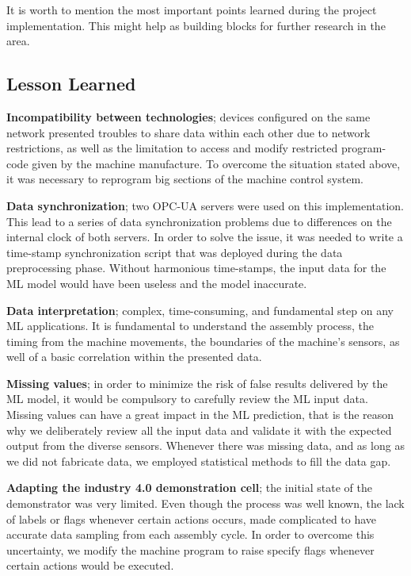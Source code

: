 \documentclass[5p,times,procedia]{elsarticle}
\begin{document}
It is worth to mention the most important points learned during the project implementation. This might help as building blocks for further research in the area.

\subsection{Lesson Learned} %

\textbf{Incompatibility between technologies}; devices configured on the same network presented troubles to share data within each other due to network restrictions, as well as the limitation to access and modify restricted program-code given by the machine manufacture. 
To overcome the situation stated above, it was necessary to reprogram big sections of the machine control system.

\textbf{Data synchronization}; two OPC-UA servers were used on this implementation. This lead to a series of data synchronization problems due to differences on the internal clock of both servers.
In order to solve the issue, it was needed to write a time-stamp synchronization script that was deployed during the data preprocessing phase. Without harmonious time-stamps, the input data for the ML model would have been useless and the model inaccurate. 

\textbf{Data interpretation}; complex, time-consuming, and fundamental step on any ML applications. It is fundamental to understand the assembly process, the timing from the machine movements, the boundaries of the machine's sensors, as well of a basic correlation within the presented data.

\textbf{Missing values}; in order to minimize the risk of false results delivered by the ML model, it would be compulsory to carefully review the ML input data. Missing values can have a great impact in the ML prediction, that is the reason why we deliberately review all the input data and validate it with the expected output from the diverse sensors. Whenever there was missing data, and as long as we did not fabricate data, we employed statistical methods to fill the data gap.

\textbf{Adapting the industry 4.0 demonstration cell}; the initial state of the demonstrator was very limited. Even though the process was well known, the lack of labels or flags whenever certain actions occurs, made complicated to have accurate data sampling from each assembly cycle. In order to overcome this uncertainty, we modify the machine program to raise specify flags whenever certain actions would be executed.
\end{document}
